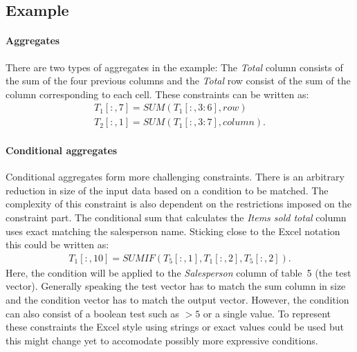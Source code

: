 \documentclass[a4paper]{article}
\newcommand{\range}[3]{#1[#2,#3]}
\newcommand{\rangeto}[2]{#1{:}#2}
\newcommand{\rangeall}{:}
\begin{document}
\subsection{Example}
\paragraph{Aggregates}
There are two types of aggregates in the example: The \textit{Total} column consists of the sum of the four previous columns and the \textit{Total} row consist of the sum of the column corresponding to each cell.
These constraints can be written as:
\begin{align}
	\range{T_1}{\rangeall}{7} = \mathit{SUM}(\range{T_1}{\rangeall}{\rangeto{3}{6}}, row)\\
	\range{T_2}{\rangeall}{1} = \mathit{SUM}(\range{T_1}{\rangeall}{\rangeto{3}{7}}, column).
\end{align}

\paragraph{Conditional aggregates}
Conditional aggregates form more challenging constraints.
There is an arbitrary reduction in size of the input data based on a condition to be matched.
The complexity of this constraint is also dependent on the restrictions imposed on the constraint part.
The conditional sum that calculates the \textit{Items sold total} column uses exact matching the salesperson name. Sticking close to the Excel notation this could be written as:
\begin{align}
	\range{T_1}{\rangeall}{10} = \mathit{SUMIF}(\range{T_5}{\rangeall}{1}, \range{T_1}{\rangeall}{2}, \range{T_5}{\rangeall}{2}).
\end{align}
Here, the condition will be applied to the \textit{Salesperson} column of table~5 (the test vector).
Generally speaking the test vector has to match the sum column in size and the condition vector has to match the output vector.
However, the condition can also consist of a boolean test such as $>5$ or a single value.
To represent these constraints the Excel style using strings or exact values could be used but this might change yet to accomodate possibly more expressive conditions.
\end{document}
